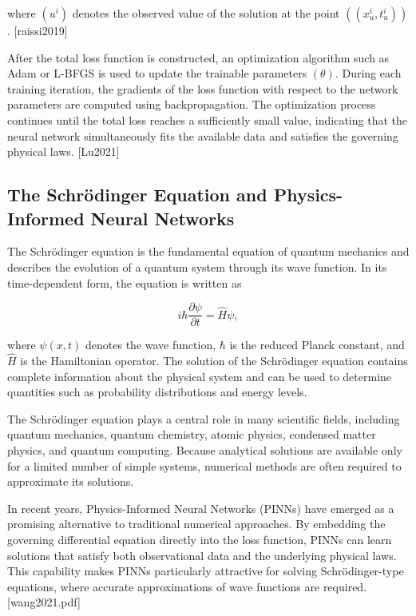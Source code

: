 \documentclass[11pt]{article}
\begin{document}
where $(u^i)$ denotes the observed value of the solution at the point $((x_u^i,t_u^i))$. [raissi2019]


After the total loss function is constructed, an optimization algorithm such 
as Adam or L-BFGS is used to update the trainable parameters $(\theta)$. 
During each training iteration, the gradients of the loss function with 
respect to the network parameters are computed using backpropagation. 
The optimization process continues until the total loss reaches a sufficiently 
small value, indicating that the neural network simultaneously fits the available 
data and satisfies the governing physical laws. [Lu2021]



\subsection{The Schrödinger Equation and Physics-Informed Neural Networks}

The Schrödinger equation is the fundamental equation of quantum mechanics and 
describes the evolution of a quantum system through its wave function. In its 
time-dependent form, the equation is written as

\begin{equation}
i\hbar \frac{\partial \psi}{\partial t}
=
\hat{H}\psi,
\end{equation}

where $\psi(x,t)$ denotes the wave function, $\hbar$ is the reduced 
Planck constant, and $\hat{H}$ is the Hamiltonian operator. 
The solution of the Schrödinger equation contains complete 
information about the physical system and can be used to 
determine quantities such as probability distributions and energy levels.

The Schrödinger equation plays a central role in many 
scientific fields, including quantum mechanics, 
quantum chemistry, atomic physics, 
condensed matter physics, and quantum computing. 
Because analytical solutions are available only for a 
limited number of simple systems, numerical methods are 
often required to approximate its solutions.

In recent years, Physics-Informed Neural Networks (PINNs) 
have emerged as a promising alternative to traditional numerical 
approaches. By embedding the governing differential 
equation directly into the loss function, PINNs can learn 
solutions that satisfy both observational data and the 
underlying physical laws. This capability makes PINNs particularly
attractive for solving Schrödinger-type equations, where accurate 
approximations of wave functions are required. [wang2021.pdf]
\end{document}
